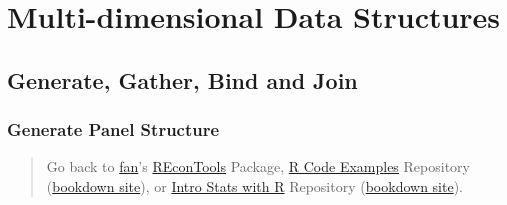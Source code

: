 \documentclass[
]{book}
\begin{document}
\begin{table}[!h]
\centering
{}
\end{table}

\hypertarget{multi-dimensional-data-structures}{%
\chapter{Multi-dimensional Data Structures}\label{multi-dimensional-data-structures}}

\hypertarget{generate-gather-bind-and-join}{%
\section{Generate, Gather, Bind and Join}\label{generate-gather-bind-and-join}}

\hypertarget{generate-panel-structure}{%
\subsection{Generate Panel Structure}\label{generate-panel-structure}}

\begin{quote}
Go back to \href{http://fanwangecon.github.io/}{fan}'s \href{https://fanwangecon.github.io/REconTools/}{REconTools} Package, \href{https://fanwangecon.github.io/R4Econ/}{R Code Examples} Repository (\href{https://fanwangecon.github.io/R4Econ/bookdown}{bookdown site}), or \href{https://fanwangecon.github.io/Stat4Econ/}{Intro Stats with R} Repository (\href{https://fanwangecon.github.io/Stat4Econ/bookdown}{bookdown site}).
\end{quote}
\end{document}
